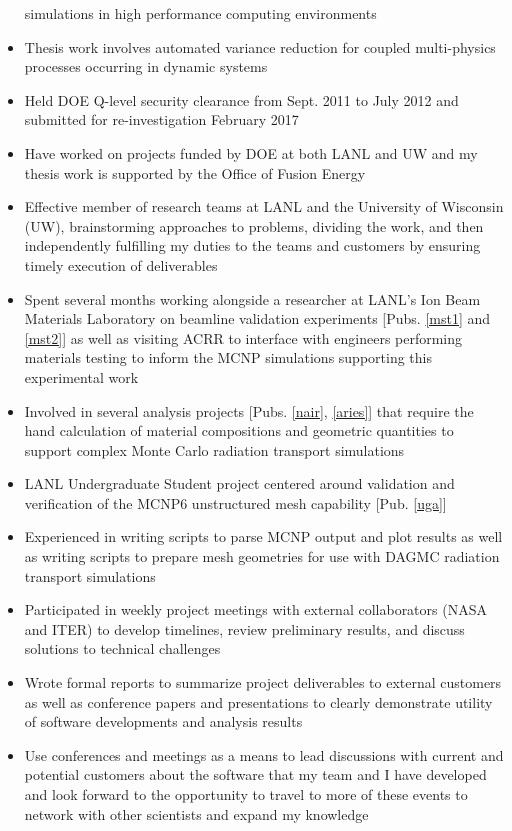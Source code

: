 \documentclass[a4paper,10pt]{article}
\begin{document}
\begin{itemize}[leftmargin=.9in,rightmargin=.875in,itemsep=1.6mm]
		       simulations
		       in high performance computing environments
	       \item Thesis work involves automated variance reduction for
		       coupled multi-physics processes occurring in dynamic
		       systems
              \item Held DOE Q-level security clearance from Sept. 2011 to July
		      2012 and submitted for re-investigation February 2017
		\item  Have worked on projects funded by DOE at both LANL and
			UW and my thesis work is supported by the Office of Fusion Energy
		\item Effective member of research teams at LANL and
			the University of Wisconsin (UW), brainstorming approaches to problems, dividing the
			work, and then independently fulfilling my duties to the teams and
			customers by ensuring timely execution of deliverables
		\item Spent several months working alongside a researcher
			at LANL's Ion Beam Materials Laboratory
			on beamline validation experiments 
		        [Pubs. \ref{mst1} and \ref{mst2}]
                        as well as
			visiting ACRR to interface with engineers performing
			materials testing to inform the MCNP simulations
			supporting this experimental work
	       \item Involved in several analysis projects
		      [Pubs. \ref{nair}, \ref{aries}]	       
			       that require the hand calculation of material compositions
			     and geometric quantities to support complex Monte
			      Carlo radiation transport simulations
	       \item  LANL Undergraduate Student project centered around validation and
		       verification of the MCNP6 unstructured mesh
		       capability [Pub. \ref{uga}]
	       \item Experienced in writing scripts to parse MCNP output
	               and plot results as well as writing scripts to
		       prepare mesh geometries for use with DAGMC
		       radiation transport simulations
                \item Participated in weekly project meetings with external collaborators (NASA and
	              ITER) to develop timelines, review preliminary results, and discuss
		      solutions to technical challenges
		\item Wrote formal reports to summarize project
			deliverables to external customers as well as conference
			papers and presentations to clearly demonstrate
			utility of software
			developments and analysis results
	       \item Use conferences and meetings as a means to lead
		       discussions with current and potential customers about
		       the software that my team and I have developed and look forward to the opportunity to travel to
		       more of these events to network with other
			scientists and expand my knowledge
		       


\end{itemize} 
\end{document}
